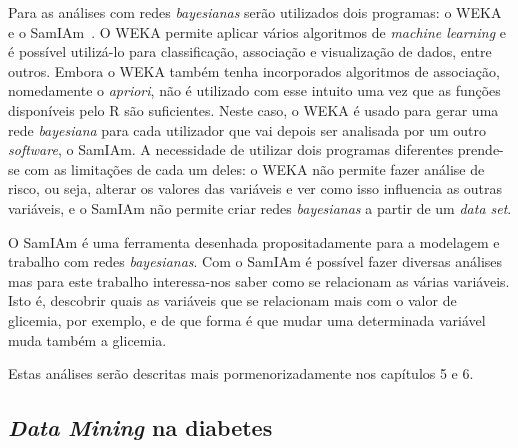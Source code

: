 Para as análises com redes \textit{bayesianas} serão utilizados dois programas: o \ac{WEKA}~\cite{weka} e o \ac{SamIAm}~\cite{samiam}.
O \ac{WEKA} permite aplicar vários algoritmos de \textit{machine learning} e é possível utilizá-lo para classificação, associação e visualização de dados, entre outros. Embora o \ac{WEKA} também tenha incorporados algoritmos de associação, nomedamente o \textit{apriori}, não é utilizado com esse intuito uma vez que as funções disponíveis pelo R são suficientes. Neste caso, o \ac{WEKA} é usado para gerar uma rede \textit{bayesiana} para cada utilizador que vai depois ser analisada por um outro \textit{software}, o \ac{SamIAm}. A necessidade de utilizar dois programas diferentes prende-se com as limitações de cada um deles: o \ac{WEKA} não permite fazer análise de risco, ou seja, alterar os valores das variáveis e ver como isso influencia as outras variáveis, e o \ac{SamIAm} não permite criar redes \textit{bayesianas} a partir de um \textit{data set}.

O \ac{SamIAm} é uma ferramenta desenhada propositadamente para a modelagem e trabalho com redes \textit{bayesianas}. Com o \ac{SamIAm} é possível fazer diversas análises mas para este trabalho interessa-nos saber como se relacionam as várias variáveis. Isto é, descobrir quais as variáveis que se relacionam mais com o valor de glicemia, por exemplo, e de que forma é que mudar uma determinada variável muda também a glicemia.

Estas análises serão descritas mais pormenorizadamente nos capítulos 5 e 6.

\subsection{\textit{Data Mining} na diabetes}

